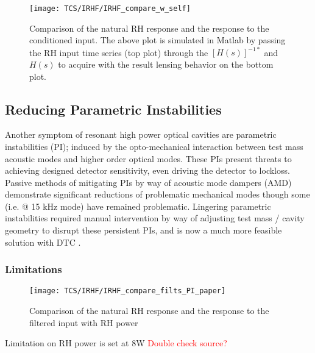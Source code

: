 \begin{figure}[H]
    \texttt{[image: TCS/IRHF/IRHF\_compare\_w\_self]}
    \caption{Comparison of the natural RH response and the response to the conditioned input. The above plot is simulated in Matlab by passing the RH input time series (top plot) through the $[H(s)]^{-1*}$ and $H(s)$ to acquire with the result lensing behavior on the bottom plot.}
    \label{fig:dynam_comparison}
\end{figure}
\newpage

\subsection{Reducing Parametric Instabilities}
Another symptom of resonant high power optical cavities are parametric instabilities (PI); induced by the opto-mechanical interaction between test mass acoustic modes and higher order optical modes. These PIs present threats to achieving designed detector sensitivity, even driving the detector to lockloss. Passive methods of mitigating PIs by way of acoustic mode dampers (AMD) demonstrate significant reductions of problematic mechanical modes though some (i.e. @ 15 kHz mode) have remained problematic. Lingering parametric instabilities required manual intervention by way of adjusting test mass / cavity geometry to disrupt these persistent PIs, and is now a much more feasible solution with DTC \cite{hardwick:2020}.  

\subsubsection{Limitations}
    \begin{figure}[H]
    \texttt{[image: TCS/IRHF/IRHF\_compare\_filts\_PI\_paper]}
    \caption{Comparison of the natural RH response and the response to the filtered input with RH power}
    \label{fig:RH_power}
\end{figure}
Limitation on RH power is set at 8W \textcolor{red}{Double check source?}


